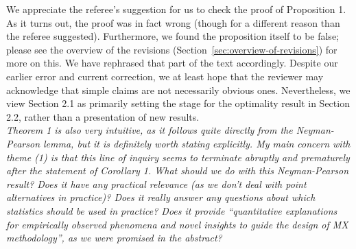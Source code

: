 \documentclass[12pt]{article}
\begin{document}
\noindent We appreciate the referee's suggestion for us to check the proof of Proposition 1. As it turns out, the proof was in fact wrong (though for a different reason than the referee suggested). Furthermore, we found the proposition itself to be false; please see the overview of the revisions (Section~\ref{sec:overview-of-revisions}) for more on this. We have rephrased that part of the text accordingly. Despite our earlier error and current correction, we at least hope that the reviewer may acknowledge that simple claims are not necessarily obvious ones. Nevertheless, we view Section 2.1 as primarily setting the stage for the optimality result in Section 2.2, rather than a presentation of new results.
\\

\textsl{Theorem 1 is also very intuitive, as it follows quite directly from the Neyman-Pearson lemma, but it is definitely worth stating explicitly. My main concern with theme (1) is that this line of inquiry seems to terminate abruptly and prematurely after the statement of Corollary 1. What should we do with this Neyman-Pearson result? Does it have any practical relevance (as we don’t deal with point alternatives in practice)? Does it really answer any questions about which statistics should be used in practice? Does it provide “quantitative explanations for empirically observed phenomena and novel insights to guide the design of MX methodology”, as we were promised in the abstract?} 
\\
\end{document}
